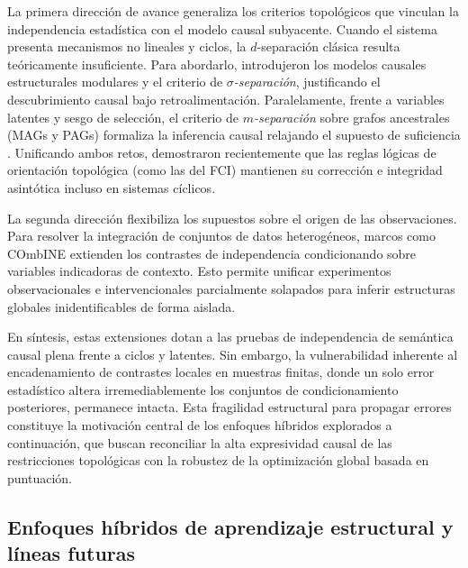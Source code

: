 La primera dirección de avance generaliza los criterios topológicos que vinculan la independencia estadística con el modelo causal subyacente. Cuando el sistema presenta mecanismos no lineales y ciclos, la $d$-separación clásica resulta teóricamente insuficiente. Para abordarlo, \citet{forre2018constraint} introdujeron los modelos causales estructurales modulares y el criterio de \emph{$\sigma$-separación}, justificando el descubrimiento causal bajo retroalimentación. Paralelamente, frente a variables latentes y sesgo de selección, el criterio de \emph{$m$-separación} sobre grafos ancestrales (MAGs y PAGs) formaliza la inferencia causal relajando el supuesto de suficiencia \citep{richardson2002ancestral}. Unificando ambos retos, \citet{mooij2020constraint} demostraron recientemente que las reglas lógicas de orientación topológica (como las del FCI) mantienen su corrección e integridad asintótica incluso en sistemas cíclicos.

La segunda dirección flexibiliza los supuestos sobre el origen de las observaciones. Para resolver la integración de conjuntos de datos heterogéneos, marcos como COmbINE \citep{triantafillou2015constraint} extienden los contrastes de independencia condicionando sobre variables indicadoras de contexto. Esto permite unificar experimentos observacionales e intervencionales parcialmente solapados para inferir estructuras globales inidentificables de forma aislada.

En síntesis, estas extensiones dotan a las pruebas de independencia de semántica causal plena frente a ciclos y latentes. Sin embargo, la vulnerabilidad inherente al encadenamiento de contrastes locales en muestras finitas, donde un solo error estadístico altera irremediablemente los conjuntos de condicionamiento posteriores, permanece intacta. Esta fragilidad estructural para propagar errores constituye la motivación central de los enfoques híbridos explorados a continuación, que buscan reconciliar la alta expresividad causal de las restricciones topológicas con la robustez de la optimización global basada en puntuación.

\subsection{Enfoques híbridos de aprendizaje estructural y líneas futuras}
\label{sec:hibridos}


